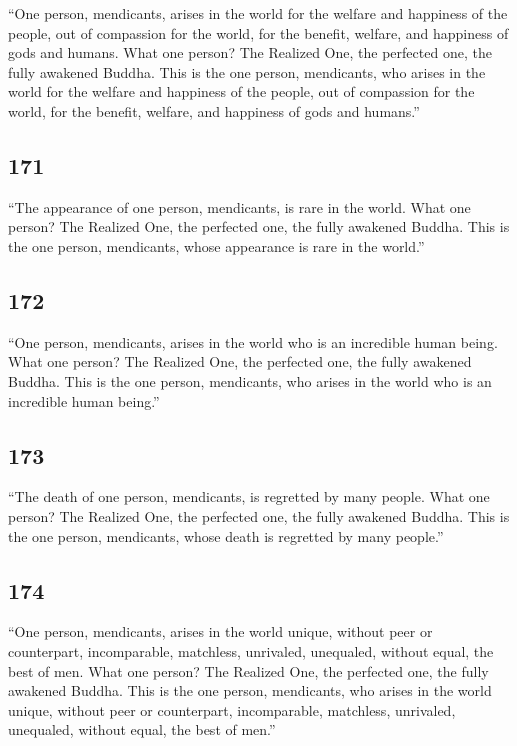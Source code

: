 \documentclass[12pt,openany]{book}%
\begin{document}
“One person, mendicants, arises in the world for the welfare and happiness of the people, out of compassion for the world, for the benefit, welfare, and happiness of gods and humans. What one person? The Realized One, the perfected one, the fully awakened Buddha. This is the one person, mendicants, who arises in the world for the welfare and happiness of the people, out of compassion for the world, for the benefit, welfare, and happiness of gods and humans.” 

\subsection*{171 }

“The appearance of one person, mendicants, is rare in the world. What one person? The Realized One, the perfected one, the fully awakened Buddha. This is the one person, mendicants, whose appearance is rare in the world.” 

\subsection*{172 }

“One person, mendicants, arises in the world who is an incredible human being. What one person? The Realized One, the perfected one, the fully awakened Buddha. This is the one person, mendicants, who arises in the world who is an incredible human being.” 

\subsection*{173 }

“The death of one person, mendicants, is regretted by many people. What one person? The Realized One, the perfected one, the fully awakened Buddha. This is the one person, mendicants, whose death is regretted by many people.” 

\subsection*{174 }

“One person, mendicants, arises in the world unique, without peer or counterpart, incomparable, matchless, unrivaled, unequaled, without equal, the best of men. What one person? The Realized One, the perfected one, the fully awakened Buddha. This is the one person, mendicants, who arises in the world unique, without peer or counterpart, incomparable, matchless, unrivaled, unequaled, without equal, the best of men.” 
\end{document}

